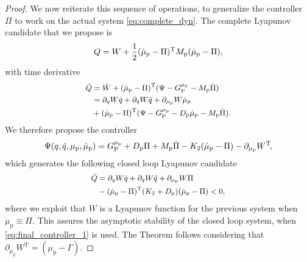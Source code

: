 \begin{proof}
	We now reiterate this sequence of operations, to generalize the controller $\Pi$ to work on the actual system \eqref{eq:complete_dyn}.
	The complete Lyapunov candidate that we propose is
	\begin{equation}\small
		Q = W + \frac{1}{2}(\dot{\mu}_\mathrm{p} - \Pi)^{\mathrm{T}} M_\mathrm{p} (\dot{\mu}_\mathrm{p} - \Pi),
	\end{equation}
	with time derivative
	\begin{equation*}\small
		\begin{split}
			\dot{Q} &= \dot{W} + (\dot{\mu}_\mathrm{p} - \Pi)^{\mathrm{T}} (\Psi - G_{\mathrm{P}}^{\mu_\mathrm{p}} - M_\mathrm{p} \dot{\Pi}) \\
			 &= \partial_{q} W \dot{q} + \partial_{\dot{q}} W \ddot{q} + \partial_{\mu_\mathrm{p}} W \dot{\mu}_p\\
			 & + (\dot{\mu}_\mathrm{p} - \Pi)^{\mathrm{T}} (\Psi - G_{\mathrm{P}}^{\mu_\mathrm{p}} - D_\mathrm{p} \dot{\mu}_\mathrm{p} - M_\mathrm{p} \dot{\Pi}) .
		\end{split}
	\end{equation*}
	We therefore propose the controller
	\begin{equation}\small\label{eq:final_controller_1}
	    \Psi(q, \dot{q}, \mu_\mathrm{p}, \dot{\mu}_\mathrm{p}) = G_{\mathrm{P}}^{\mu_\mathrm{p}} + D_\mathrm{p} \Pi + M_\mathrm{p} \dot{\Pi} - K_2 (\dot{\mu}_\mathrm{p} - \Pi) 
	    - \partial_{\mu_\mathrm{p}} W^{\mathrm{T}}\!,
	\end{equation}
	which generates the following closed loop Lyapunov candidate
	\begin{equation}\small
	    \begin{split}
			\dot{Q} &= \partial_{q} W \dot{q} + \partial_{\dot{q}} W \ddot{q} + \partial_{\mu_\mathrm{p}} W \Pi \\
			&- (\dot{\mu}_\mathrm{p} - \Pi)^{\mathrm{T}} (K_2 + D_\mathrm{p}) (\dot{\mu}_\mathrm{p} - \Pi)
			< 0,
	    \end{split}
	\end{equation}
	where we exploit that $W$ is a Lyapunov function for the previous system when $\dot{\mu}_\mathrm{p} \equiv \Pi$. This assures the asymptotic stability of the closed loop system, when \eqref{eq:final_controller_1} is used. The Theorem follows considering that $\partial_{\mu_\mathrm{p}} W^{\mathrm{T}} = (\mu_\mathrm{p} - \Gamma)$.
	

\end{proof}
